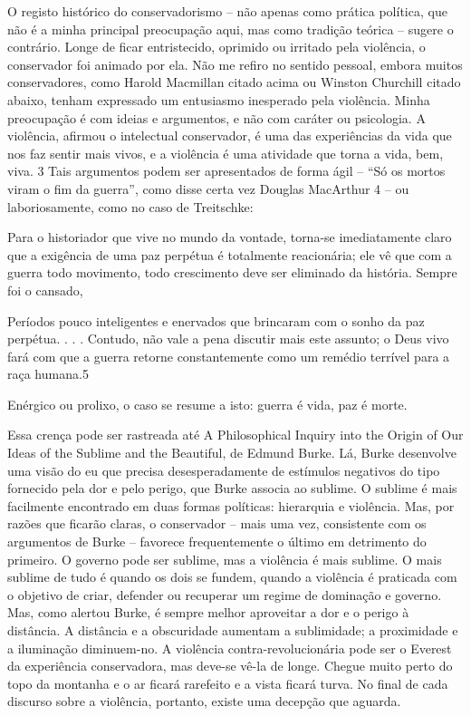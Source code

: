 O registo histórico do conservadorismo – não apenas como prática política, que não é a minha principal preocupação aqui, mas como tradição teórica – sugere o contrário. Longe de ficar entristecido, oprimido ou irritado pela violência, o conservador foi animado por ela. Não me refiro no sentido pessoal, embora muitos conservadores, como Harold Macmillan citado acima ou Winston Churchill citado abaixo, tenham expressado um entusiasmo inesperado pela violência. Minha preocupação é com ideias e argumentos, e não com caráter ou psicologia. A violência, afirmou o intelectual conservador, é uma das experiências da vida que nos faz sentir mais vivos, e a violência é uma atividade que torna a vida, bem, viva. {\color{blue}3} Tais argumentos podem ser apresentados de forma ágil – “Só os mortos viram o fim da guerra”, como disse certa vez Douglas MacArthur {\color{blue}4} – ou laboriosamente, como no caso de Treitschke:
 \par 
Para o historiador que vive no mundo da vontade, torna-se imediatamente claro que a exigência de uma paz perpétua é totalmente reacionária; ele vê que com a guerra todo movimento, todo crescimento deve ser eliminado da história. Sempre foi o cansado,
 \par 
Períodos pouco inteligentes e enervados que brincaram com o sonho da paz perpétua. . . . Contudo, não vale a pena discutir mais este assunto; o Deus vivo fará com que a guerra retorne constantemente como um remédio terrível para a raça humana.{\color{blue}5}
 \par 
Enérgico ou prolixo, o caso se resume a isto: guerra é vida, paz é morte.
 \par 
Essa crença pode ser rastreada até A Philosophical Inquiry into the Origin of Our Ideas of the Sublime and the Beautiful, de Edmund Burke. Lá, Burke desenvolve uma visão do eu que precisa desesperadamente de estímulos negativos do tipo fornecido pela dor e pelo perigo, que Burke associa ao sublime. O sublime é mais facilmente encontrado em duas formas políticas: hierarquia e violência. Mas, por razões que ficarão claras, o conservador – mais uma vez, consistente com os argumentos de Burke – favorece frequentemente o último em detrimento do primeiro. O governo pode ser sublime, mas a violência é mais sublime. O mais sublime de tudo é quando os dois se fundem, quando a violência é praticada com o objetivo de criar, defender ou recuperar um regime de dominação e governo. Mas, como alertou Burke, é sempre melhor aproveitar a dor e o perigo à distância. A distância e a obscuridade aumentam a sublimidade; a proximidade e a iluminação diminuem-no. A violência contra-revolucionária pode ser o Everest da experiência conservadora, mas deve-se vê-la de longe. Chegue muito perto do topo da montanha e o ar ficará rarefeito e a vista ficará turva. No final de cada discurso sobre a violência, portanto, existe uma decepção que aguarda.
